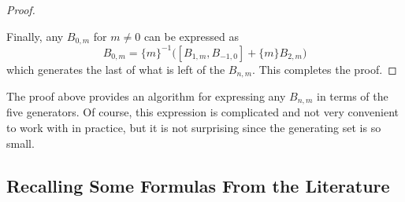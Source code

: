 \begin{proof}
\begin{center}
\end{center}

Finally, any $B_{0,m}$ for $m \neq 0$ can be expressed as
\[
    B_{0,m} = \{ m \}^{-1} \Big( [B_{1,m}, B_{-1,0}] + \{ m \} B_{2,m} \Big)
\]
which generates the last of what is left of the $B_{n,m}$. This completes the proof.
\end{proof}

\begin{remark}
The proof above provides an algorithm for expressing any $B_{n,m}$ in terms of the five generators. Of course, this expression is complicated and not very convenient to work with in practice, but it is not surprising since the generating set is so small. 
\end{remark}








\subsection{Recalling Some Formulas From the Literature}

